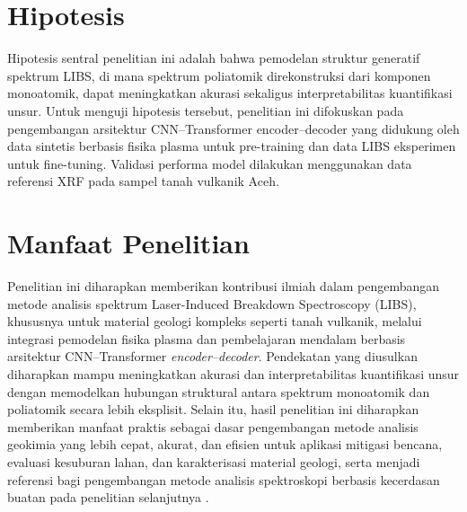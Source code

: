 \section{Hipotesis}
Hipotesis sentral penelitian ini adalah bahwa pemodelan struktur generatif spektrum LIBS, di mana spektrum poliatomik direkonstruksi dari komponen monoatomik, dapat meningkatkan akurasi sekaligus interpretabilitas kuantifikasi unsur. Untuk menguji hipotesis tersebut, penelitian ini difokuskan pada pengembangan arsitektur CNN–Transformer encoder–decoder yang didukung oleh data sintetis berbasis fisika plasma untuk pre-training dan data LIBS eksperimen untuk fine-tuning. Validasi performa model dilakukan menggunakan data referensi XRF pada sampel tanah vulkanik Aceh.

\section{Manfaat Penelitian}
Penelitian ini diharapkan memberikan kontribusi ilmiah dalam pengembangan metode analisis spektrum Laser-Induced Breakdown Spectroscopy (LIBS), khususnya untuk material geologi kompleks seperti tanah vulkanik, melalui integrasi pemodelan fisika plasma dan pembelajaran mendalam berbasis arsitektur CNN--Transformer \textit{encoder--decoder}. Pendekatan yang diusulkan diharapkan mampu meningkatkan akurasi dan interpretabilitas kuantifikasi unsur dengan memodelkan hubungan struktural antara spektrum monoatomik dan poliatomik secara lebih eksplisit. Selain itu, hasil penelitian ini diharapkan memberikan manfaat praktis sebagai dasar pengembangan metode analisis geokimia yang lebih cepat, akurat, dan efisien untuk aplikasi mitigasi bencana, evaluasi kesuburan lahan, dan karakterisasi material geologi, serta menjadi referensi bagi pengembangan metode analisis spektroskopi berbasis kecerdasan buatan pada penelitian selanjutnya \citep{idris_geochemistry_2022, manelski_libs_2024}.
